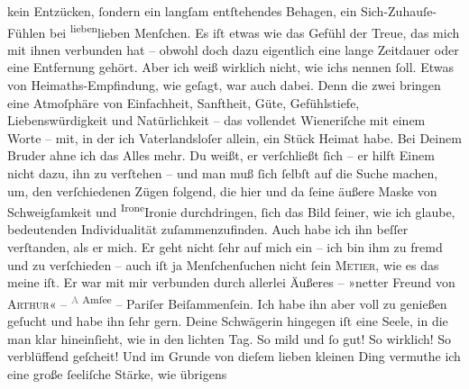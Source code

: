 \begin{ledgroupsized}[t]{13cm}
               kein Entzücken, ſondern ein langſam entſtehendes Behagen, ein Sich-Zuhauſe-Fühlen bei \substVorne{}\textsuperscript{lieben}{\allowbreak}\substDazwischen{}lieben\substHinten{} Menſchen. Es iſt etwas wie das Gefühl der Treue, das mich mit ihnen
               verbunden hat – obwohl doch dazu eigentlich eine lange Zeitdauer oder eine Entfernung
               gehört. Aber ich weiß wirklich nicht, wie ichs nennen ſoll. Etwas von
               Heimaths-Empfindung, wie geſagt, {\pb}war auch dabei.
               Denn die zwei bringen eine Atmoſphäre von Einfachheit, Sanftheit, Güte, Gefühlstiefe,
               Liebenswürdigkeit und Natürlichkeit – das vollendet Wieneriſche mit einem Worte – mit, in der ich Vaterlandsloſer allein, \strikeout{\textcolor{gray}{man}} ein Stück Heimat habe. Bei Deinem Bruder ahne ich das Alles mehr. Du weißt, er verſchließt
               ſich – er hilft Einem nicht dazu, ihn zu verſtehen – und man muß ſich ſelbſt auf die
               Suche machen, um, den verſchiedenen Zügen folgend, die hier und da ſeine äußere Maske
               von Schweigſamkeit und \substVorne{}\textsuperscript{Irone}\substDazwischen{}Ironie\substHinten{} durchdringen, ſich {\pb}das Bild ſeiner, wie
               ich glaube, bedeutenden Individualität zuſammenzufinden. Auch habe ich ihn beſſer
               verſtanden, als er mich. Er geht nicht ſehr auf mich ein – ich bin ihm zu fremd und
               zu verſchieden – auch iſt ja Menſchenſuchen nicht ſein \textsc{Metier}, wie es das meine iſt. Er war mit mir verbunden durch allerlei
               Äußeres – »netter Freund von \textsc{Arthur}« – \substVorne{}\textsuperscript{\textcolor{gray}{A} Amſee}{\allowbreak}\substDazwischen{}\textsc{\label{K_L02608-1v}\label{K_L02608-1h}}\substHinten{} – Pariſer Beiſammenſein. Ich habe ihn
               aber voll zu genießen geſucht und habe ihn ſehr gern. Deine Schwägerin hingegen iſt eine Seele, in die
               man klar hineinſieht, wie in den lichten Tag. So mild {\pb}und ſo gut! So wirklich! So verblüffend geſcheit!
               Und im Grunde von dieſem lieben kleinen Ding vermuthe ich eine große ſeeliſche Stärke, wie übrigens

\end{ledgroupsized}
